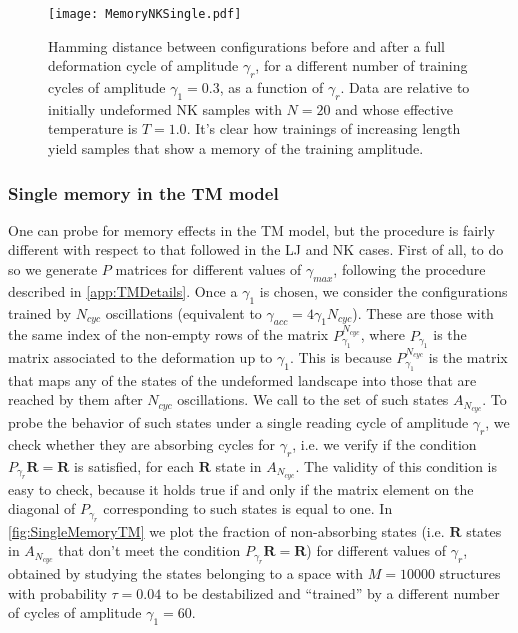 \begin{figure} 
\centering 
\texttt{[image: MemoryNKSingle.pdf]} 
\caption{Hamming distance between configurations before and after a full deformation cycle of amplitude $\gamma_{r}$, for a different number of training cycles of amplitude $\gamma_{1} = 0.3$, as a function of $\gamma_{r}$. Data are relative to initially undeformed NK samples with $N=20$ and whose effective temperature is $T=1.0$. It's clear how trainings of increasing length yield samples that show a memory of the training amplitude. \label{fig:SingleMemoryNK}}
\end{figure}

\subsubsection{Single memory in the TM model}

One can probe for memory effects in the TM model, but the procedure is fairly different with respect to that followed in the LJ and NK cases. 
First of all, to do so we generate $P$ matrices for different values of $\gamma_{max}$, following the procedure described in \autoref{app:TMDetails}.
Once a $\gamma_{1}$ is chosen, we consider the configurations trained by $N_{cyc}$ oscillations (equivalent to $\gamma_{acc} = 4\gamma_{1} N_{cyc}$). These are those with the same index of the non-empty rows of the matrix $P_{\gamma_{1}}^{N_{cyc}}$, where $P_{\gamma_{1}}$ is the matrix associated to the deformation up to $\gamma_{1}$. This is because $P_{\gamma_{1}}^{N_{cyc}}$ is the matrix that maps any of the states of the undeformed landscape into those that are reached by them after $N_{cyc}$ oscillations. We call to the set of such states $A_{N_{cyc}}$.
To probe the behavior of such states under a single reading cycle of amplitude $\gamma_{r}$, we check whether they are absorbing cycles for $\gamma_{r}$, i.e. we verify if the condition $P_{\gamma_{r}} \mathbf{R} = \mathbf{R}$ is satisfied, for each $\mathbf{R}$ state in $A_{N_{cyc}}$. The validity of this condition is easy to check, because it holds true if and only if the matrix element on the diagonal of $P_{\gamma_{r}}$ corresponding to such states is equal to one. In \autoref{fig:SingleMemoryTM} we plot the fraction of non-absorbing states (i.e. $\mathbf{R}$ states in $A_{N_{cyc}}$ that don't meet the condition $P_{\gamma_{r}} \mathbf{R} = \mathbf{R}$) for different values of $\gamma_{r}$, obtained by studying the states belonging to a space with $M= 10000$ structures with probability $\tau = 0.04$ to be destabilized and ``trained'' by a different number of cycles of amplitude $\gamma_{1} = 60$.

